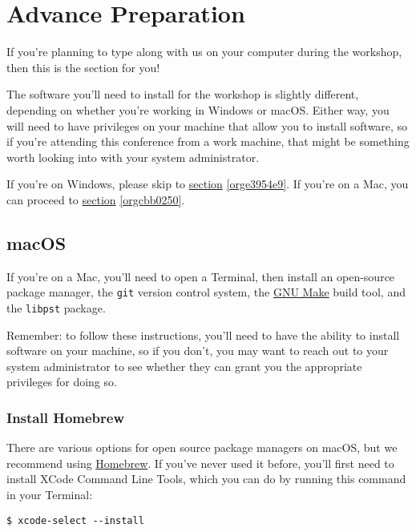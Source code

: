 \documentclass[11pt]{article}
\begin{document}
\section{Advance Preparation \label{orgaf929a8}}
\label{sec:org6082594}

If you're planning to type along with us on your computer during the
workshop, then this is the section for you!

The software you'll need to install for the workshop is slightly
different, depending on whether you're working in Windows or macOS.
Either way, you will need to have privileges on your machine that
allow you to install software, so if you're attending this conference
from a work machine, that might be something worth looking into with
your system administrator.

If you're on Windows, please skip to \hyperref[orge3954e9]{section} \ref{orge3954e9}.  If you're on a
Mac, you can proceed to \hyperref[orgcbb0250]{section} \ref{orgcbb0250}.

\subsection{macOS \label{orgcbb0250}}
\label{sec:org27341a6}

If you're on a Mac, you'll need to open a Terminal, then install an
open-source package manager, the \texttt{git} version control system, the
\href{https://www.gnu.org/software/make/}{GNU Make} build tool, and the
\texttt{libpst} package.

Remember: to follow these instructions, you'll need to have the
ability to install software on your machine, so if you don't, you may
want to reach out to your system administrator to see whether they can
grant you the appropriate privileges for doing so.

\subsubsection{Install Homebrew}
\label{sec:org7fd256e}

There are various options for open source package managers on macOS,
but we recommend using \href{https://brew.sh}{Homebrew}.  If you've never used it
before, you'll first need to install XCode Command Line Tools, which
you can do by running this command in your Terminal:

\begin{verbatim}
$ xcode-select --install
\end{verbatim}
\end{document}
